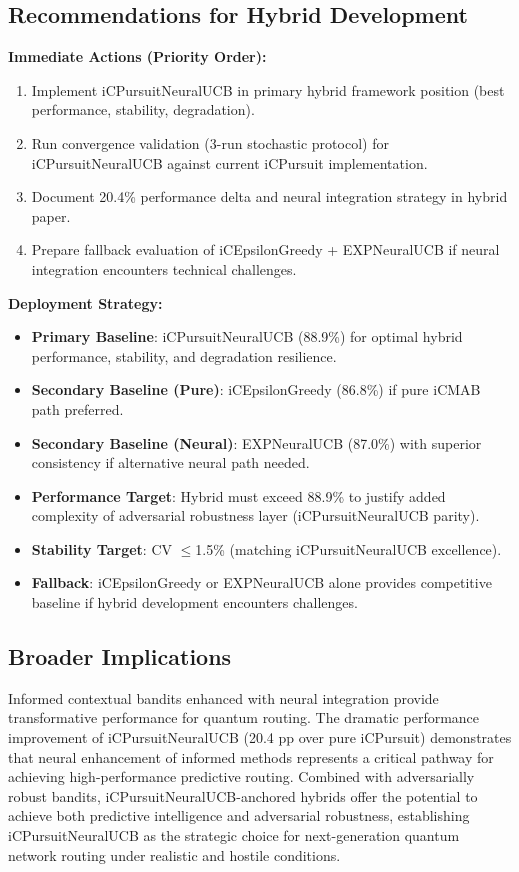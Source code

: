 \documentclass[12pt,a4paper]{article}
\begin{document}
\subsection{Recommendations for Hybrid Development}

\textbf{Immediate Actions (Priority Order):}
\begin{enumerate}
\item Implement iCPursuitNeuralUCB in primary hybrid framework position (best performance, stability, degradation).
\item Run convergence validation (3-run stochastic protocol) for iCPursuitNeuralUCB against current iCPursuit implementation.
\item Document 20.4\% performance delta and neural integration strategy in hybrid paper.
\item Prepare fallback evaluation of iCEpsilonGreedy + EXPNeuralUCB if neural integration encounters technical challenges.
\end{enumerate}

\textbf{Deployment Strategy:}
\begin{itemize}
\item \textbf{Primary Baseline}: iCPursuitNeuralUCB (88.9\%) for optimal hybrid performance, stability, and degradation resilience.
\item \textbf{Secondary Baseline (Pure)}: iCEpsilonGreedy (86.8\%) if pure iCMAB path preferred.
\item \textbf{Secondary Baseline (Neural)}: EXPNeuralUCB (87.0\%) with superior consistency if alternative neural path needed.
\item \textbf{Performance Target}: Hybrid must exceed 88.9\% to justify added complexity of adversarial robustness layer (iCPursuitNeuralUCB parity).
\item \textbf{Stability Target}: CV $\leq$1.5\% (matching iCPursuitNeuralUCB excellence).
\item \textbf{Fallback}: iCEpsilonGreedy or EXPNeuralUCB alone provides competitive baseline if hybrid development encounters challenges.
\end{itemize}

\subsection{Broader Implications}

Informed contextual bandits enhanced with neural integration provide transformative performance for quantum routing. The dramatic performance improvement of iCPursuitNeuralUCB (20.4 pp over pure iCPursuit) demonstrates that neural enhancement of informed methods represents a critical pathway for achieving high-performance predictive routing. Combined with adversarially robust bandits, iCPursuitNeuralUCB-anchored hybrids offer the potential to achieve both predictive intelligence and adversarial robustness, establishing iCPursuitNeuralUCB as the strategic choice for next-generation quantum network routing under realistic and hostile conditions.
\end{document}
